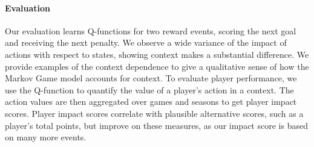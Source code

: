 \documentclass[]{article}
\begin{document}

\paragraph{Evaluation} Our evaluation learns Q-functions for two reward events, scoring the next goal and receiving the next penalty. We observe a wide variance of the impact of actions with respect to states, showing context makes a substantial difference. We provide examples of the context dependence to give a qualitative sense of how the Markov Game model accounts for context. %
To evaluate player performance, we use the Q-function to quantify the value of a player's action in a context. The action values are then aggregated over games and seasons to get player impact scores. Player impact scores correlate with plausible alternative scores, such as a player's total points, but improve on these measures, as our impact score is based on many more events.

\end{document}
